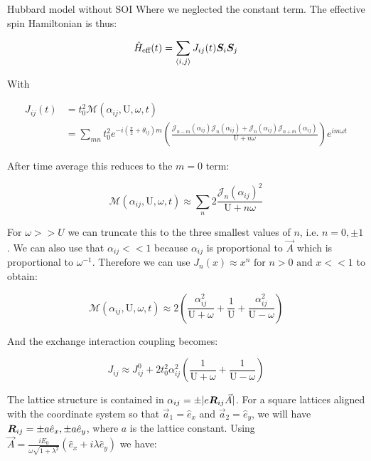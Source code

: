 \begin{section}{Hubbard model without SOI}
Where we neglected the constant term. The effective spin Hamiltonian is thus:

\begin{equation}
\hat{H}_{\text{eff}}(t) = \sum_{\langle i,j \rangle} J_{ij}(t) \boldsymbol{S}_i \boldsymbol{S}_j
\end{equation}

With 

\begin{align}
J_{ij}(t) &= t_0^2 \mathcal{M}(\alpha_{ij}, \text{U}, \omega, t) \nonumber \\
&=\sum_{mn} t_0^2 e^{-i(\frac{\pi}{2}+\theta_{ij})m}\left(\frac{\mathcal{J}_{n-m}(\alpha_{ij})\mathcal{J}_{n}(\alpha_{ij})+\mathcal{J}_{n}(\alpha_{ij})\mathcal{J}_{n+m}(\alpha_{ij})}{\text{U}+n\omega} \right) e^{im\omega t} \label{Jij1}
\end{align}

After time average this reduces to the $m=0$ term:

\begin{equation}
\mathcal{M}(\alpha_{ij}, \text{U}, \omega, t) \approx \sum_{n} 2 \frac{\mathcal{J}_n(\alpha_{ij})^2}{\text{U}+n\omega}
\end{equation}

For $\omega>>U$ we can truncate this to the three smallest values of $n$, i.e. $n=0, \pm 1$. We can also use that $\alpha_{ij} << 1$ because $\alpha_{ij}$ is proportional to $\vec{A}$ which is proportional to $\omega^{-1}$. Therefore we can use $J_n(x) \approx x^n \text{ for } n>0 \text{ and } x << 1$ to obtain:

\begin{equation}
\label{MFactorApprox}
\mathcal{M}(\alpha_{ij}, \text{U}, \omega, t) \approx 2 \left(\frac{\alpha_{ij}^2}{\text{U}+\omega} +\frac{1}{\text{U}} +\frac{\alpha_{ij}^2}{\text{U}-\omega} \right)
\end{equation}

And the exchange interaction coupling becomes:

\begin{equation}
\label{Jij2}
J_{ij} \approx J_{ij}^0 + 2t_0^2 \alpha_{ij}^2 \left( \frac{1}{\text{U}+\omega} + \frac{1}{\text{U}-\omega} \right)
\end{equation}

The lattice structure is contained in $\alpha_{ij} = \pm|e\boldsymbol{R}_{ij}\vec{A}|$. For a square lattices aligned with the coordinate system so that $\vec{a}_1=\hat{e}_x$ and $\vec{a}_2=\hat{e}_y$, we will have $\boldsymbol{R}_{ij} = \pm a\hat{e}_x,\pm a\hat{e}_y$, where $a$ is the lattice constant. Using $\vec{A}=\frac{iE_0}{\omega\sqrt{1+\lambda^2}}(\hat{e}_x+i\lambda\hat{e}_y)$ we have:


\end{section}
